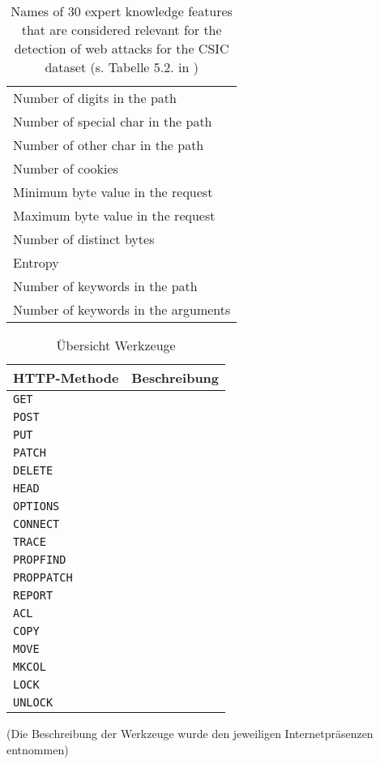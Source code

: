 \begin{table}[h]
\begin{tabular}{|l|}
    Number of digits in the path\\
    Number of special char in the path\\
    Number of other char in the path\\
    Number of cookies\\
    Minimum byte value in the request\\
    Maximum byte value in the request\\
    Number of distinct bytes\\
    Entropy\\
    Number of keywords in the path\\
    Number of keywords in the arguments\\
    \hline
  \end{tabular}
  \caption{Names of 30 expert knowledge features that are considered relevant for the detection of web attacks for the CSIC dataset (s. Tabelle 5.2. in \cite{Giménez2015})}
  \label{tab:tgfeatures}
\end{table}

\begin{table}[h]
  \centering
  \begin{tabular}{|l | p{7cm} |}
    \hline
    \textbf{HTTP-Methode} & \textbf{Beschreibung} \\
    \hline
    \verb=GET= &  \\
    \verb=POST= & \\
    \verb=PUT= & \\
    \verb=PATCH= & \\
    \verb=DELETE= & \\
    \verb=HEAD= & \\
    \verb=OPTIONS= & \\
    \verb=CONNECT= & \\
    \verb=TRACE= & \\
    \verb=PROPFIND= & \\
    \verb=PROPPATCH= &  \\
    \verb=REPORT= & \\
    \verb=ACL= & \\
    \verb=COPY= & \\
    \verb=MOVE= & \\
    \verb=MKCOL= & \\
    \verb=LOCK= & \\
    \verb=UNLOCK= & \\
    \hline
  \end{tabular}
  
  \caption{Übersicht Werkzeuge}
  \medskip
  \small
  (Die Beschreibung der Werkzeuge wurde den jeweiligen Internetpräsenzen entnommen)
  \label{tab:my_tools}
\end{table}
